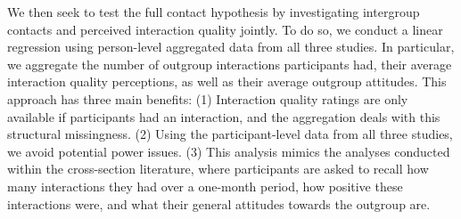 \documentclass[man, 12pt, a4paper, mask]{apa7}
\theoremstyle{break}
\theoremstyle{plain}
\begin{document}

We then seek to test the full contact hypothesis by investigating intergroup contacts and perceived interaction quality jointly. To do so, we conduct a linear regression using person-level aggregated data from all three studies. In particular, we aggregate the number of outgroup interactions participants had, their average interaction quality perceptions, as well as their average outgroup attitudes. This approach has three main benefits: (1) Interaction quality ratings are only available if participants had an interaction, and the aggregation deals with this structural missingness. (2) Using the participant-level data from all three studies, we avoid potential power issues. (3) This analysis mimics the analyses conducted within the cross-section literature, where participants are asked to recall how many interactions they had over a one-month period, how positive these interactions were, and what their general attitudes towards the outgroup are.
\end{document}

